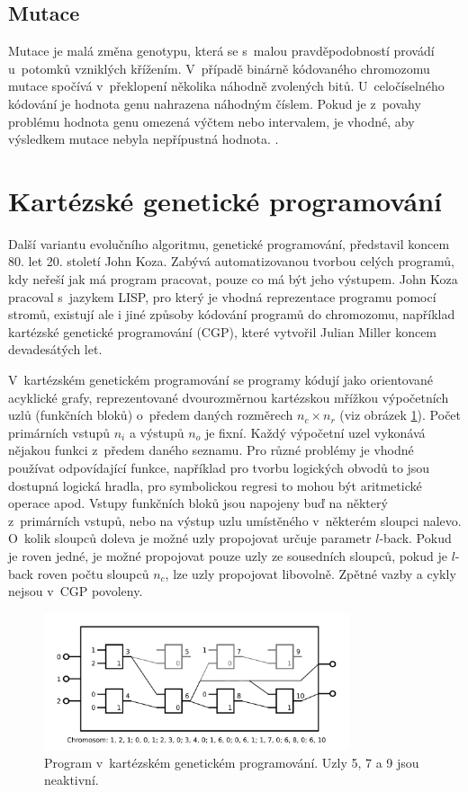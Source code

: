 \subsection{Mutace}

Mutace je malá změna genotypu, která se s~malou pravděpodobností provádí u~potomků vzniklých křížením. V~případě binárně kódovaného chromozomu mutace spočívá v~překlopení několika náhodně zvolených bitů. U~celočíselného kódování je hodnota genu nahrazena náhodným číslem. Pokud je z~povahy problému hodnota genu omezená výčtem nebo intervalem, je vhodné, aby výsledkem mutace nebyla nepřípustná hodnota. \cite{Modra}.

\section{Kartézské genetické programování}

Další variantu evolučního algoritmu, genetické programování, představil koncem 80. let 20. století John Koza. Zabývá automatizovanou tvorbou celých programů, kdy neřeší jak má program pracovat, pouze co má být jeho výstupem. John Koza pracoval s~jazykem LISP, pro který je vhodná reprezentace programu pomocí stromů, existují ale i jiné způsoby kódování programů do chromozomu, například kartézské genetické programování (CGP), které vytvořil Julian Miller koncem devadesátých let.

V~kartézském genetickém programování se programy kódují jako orientované acyklické grafy, reprezentované dvourozměrnou kartézskou mřížkou výpočetních uzlů (funkčních bloků) o~předem daných rozměrech $n_c \times n_r$ (viz obrázek \ref{obrCGP}). Počet primárních vstupů $n_i$ a výstupů $n_o$ je fixní. Každý výpočetní uzel vykonává nějakou funkci z~předem daného seznamu. Pro různé problémy je vhodné používat odpovídající funkce, například pro tvorbu logických obvodů to jsou dostupná logická hradla, pro symbolickou regresi to mohou být aritmetické operace apod. Vstupy funkčních bloků jsou napojeny buď na některý z~primárních vstupů, nebo na výstup uzlu umístěného v~některém sloupci nalevo. O~kolik sloupců doleva je možné uzly propojovat určuje parametr $l$-back. Pokud je roven jedné, je možné propojovat pouze uzly ze sousedních sloupců, pokud je $l$-back roven počtu sloupců $n_c$, lze uzly propojovat libovolně. Zpětné vazby a cykly nejsou v~CGP povoleny.

\begin{figure}[htb]
    \centering\includegraphics[width=0.8\textwidth]{fig/cgp.pdf}
    \caption{Program v~kartézském genetickém programování. Uzly 5, 7 a 9 jsou neaktivní.}
    \label{obrCGP}
\end{figure}

